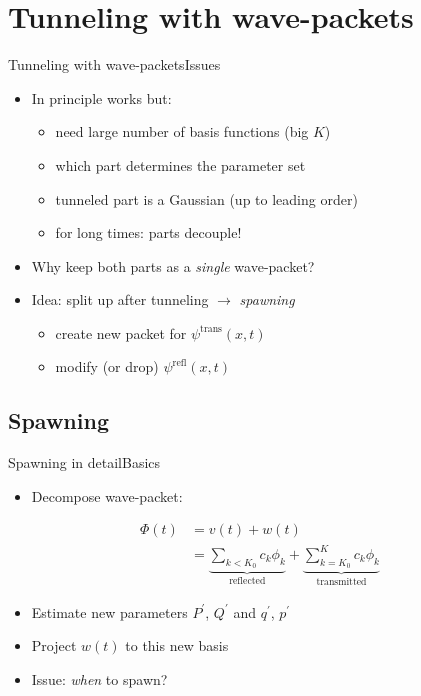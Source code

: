 \documentclass{beamer}
\begin{document}
\section{Tunneling with wave-packets}


\begin{frame}{Tunneling with wave-packets}{Issues}
  \begin{itemize}
    \item   In principle works but:
    \begin{itemize}
      \item need large number of basis functions (big $K$)
      \item which part determines the parameter set
      \item tunneled part is a Gaussian (up to leading order)
      \item for long times: parts decouple!
    \end{itemize}
  \end{itemize}
  \begin{itemize}
    \item Why keep both parts as a \emph{single} wave-packet?
  \end{itemize}
  \begin{itemize}
    \item Idea: split up after tunneling $\rightarrow$ \emph{spawning}
    \begin{itemize}
      \item create new packet for $\psi^{\text{trans}}(x,t)$
      \item modify (or drop) $\psi^{\text{refl}}(x,t)$
    \end{itemize}
  \end{itemize}
\end{frame}


\subsection{Spawning}


\begin{frame}{Spawning in detail}{Basics}
  \begin{itemize}
    \item Decompose wave-packet:
  \end{itemize}
  \begin{align*}
    \Phi(t) &= v(t) + w(t) \\
            &= \underbrace{\sum_{k<K_0} c_k \phi_k}_{\text{reflected}} + \underbrace{\sum_{k=K_0}^{K} c_k \phi_k}_{\text{transmitted}}
  \end{align*}
  \begin{itemize}
    \item Estimate new parameters $P^\prime$, $Q^\prime$ and $q^\prime$, $p^\prime$
    \item Project $w(t)$ to this new basis
  \end{itemize}
  \begin{itemize}
    \item Issue: \emph{when} to spawn?
  \end{itemize}
\end{frame}
\end{document}
